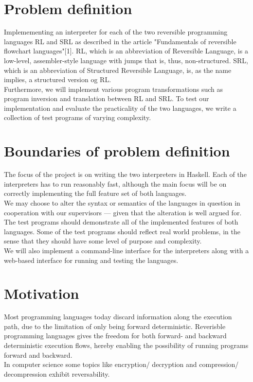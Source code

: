 \section{Problem definition}
\label{sec:problem_definition}
Implemementing an interpreter for each of the two reversible programming languages RL and SRL as described in the article "Fundamentals of reversible flowchart languages"[1]. RL, which is an abbreviation of Reversible Language, is a low-level, assembler-style language with jumps that is, thus, non-structured. SRL, which is an abbreviation of Structured Reversible Language, is, as the name implies, a structured version og RL. \\
\indent Furthermore, we will implement various program transformations such as program inversion and translation between RL and SRL. %
To test our implementation and evaluate the practicality of the two languages, we write a collection of test programs of varying complexity.

\section{Boundaries of problem definition}
\label{sec:boundaries_of_problem_definition}

The focus of the project is on writing the two interpreters in Haskell. Each of the interpreters has to run reasonably fast, although the main focus will be on correctly implementing the full feature set of both languages. \\
\indent We may choose to alter the syntax or semantics of the languages in question in cooperation with our supervisors --- given that the alteration is well argued for. \\
\indent The test programs should demonstrate all of the implemented features of both languages. Some of the test programs should reflect real world problems, in the sense that they should have some level of purpose and complexity. \\
\indent We will also implement a command-line interface for the interpreters along with a web-based interface for running and testing the languages.

\section{Motivation}
\label{sec:motivation}
Most programming languages today discard information along the execution path, due to the limitation of only being forward deterministic. Reverisble programming languages gives the freedom for both forward- and backward deterministic execution flows, hereby enabling the possibility of running programs forward and backward.\\
In computer science some topics like encryption/ decryption and compression/ decompression exhibit reversability.

